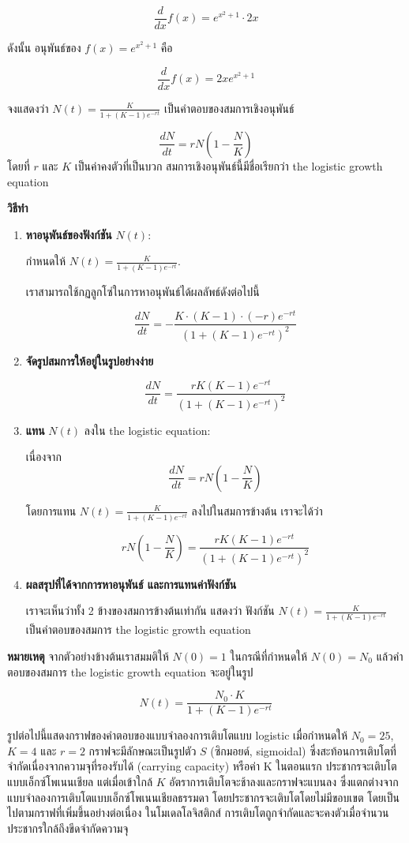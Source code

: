 \documentclass[
]{book}
\begin{document}
\[ \frac{d}{dx} f(x) = e^{x^2 + 1} \cdot 2x \]

ดังนั้น อนุพันธ์ของ \(f(x) = e^{x^2 + 1}\) คือ

\[ \boxed{\frac{d}{dx} f(x) = 2x e^{x^2 + 1}} \]

จงแสดงว่า \(N(t) = \frac{K}{1 + (K - 1) e^{-rt}}\)
เป็นคำตอบของสมการเชิงอนุพันธ์

\[ \frac{dN}{dt} = rN\left(1 - \frac{N}{K}\right) \]โดยที่ \(r\) และ \(K\)
เป็นค่าคงตัวที่เป็นบวก สมการเชิงอนุพันธ์นี้มีชื่อเรียกว่า the logistic growth equation

\textbf{วิธีทำ}

\begin{enumerate}
\def\labelenumi{\arabic{enumi}.}
\item
  \textbf{หาอนุพันธ์ของฟังก์ชัน} \(N(t)\):

  กำหนดให้ \(N(t) = \frac{K}{1 + (K - 1) e^{-rt}}\).

  เราสามารถใช้กฏลูกโซ่ในการหาอนุพันธ์ได้ผลลัพธ์ดังต่อไปนี้

  \[ \frac{dN}{dt} = -\frac{K \cdot (K - 1) \cdot (-r) e^{-rt}}{(1 + (K - 1) e^{-rt})^2} \]
\item
  \textbf{จัดรูปสมการให้อยู่ในรูปอย่างง่าย}

  \[ \frac{dN}{dt} = \frac{rK(K - 1) e^{-rt}}{(1 + (K - 1) e^{-rt})^2} \]
\item
  \textbf{แทน} \(N(t)\) ลงใน the logistic equation:

  เนื่องจาก\[ \frac{dN}{dt} = rN\left(1 - \frac{N}{K}\right) \]

  โดยการแทน \(N(t) = \frac{K}{1 + (K - 1) e^{-rt}}\) ลงไปในสมการข้างต้น
  เราจะได้ว่า

  \[ rN\left(1 - \frac{N}{K}\right) = \frac{rK(K - 1) e^{-rt}}{(1 + (K - 1) e^{-rt})^2} \]
\item
  \textbf{ผลสรุปที่ได้จากการหาอนุพันธ์ และการแทนค่าฟังก์ชัน}

  เราจะเห็นว่าทั้ง 2 ข้างของสมการข้างต้นเท่ากัน แสดงว่า ฟังก์ชัน
  \(N(t) = \frac{K}{1 + (K - 1) e^{-rt}}\) เป็นคำตอบของสมการ the logistic
  growth equation
\end{enumerate}

\textbf{หมายเหตุ} จากตัวอย่างข้างต้นเราสมมติให้ \(N(0) = 1\) ในกรณีที่กำหนดให้
\(N(0) = N_0\) แล้วคำตอบของสมการ the logistic growth equation จะอยู่ในรูป

\[N(t) = \frac{N_0 \cdot K}{1 + (K - 1) e^{-rt}}\]

รูปต่อไปนี้แสดงกราฟของคำตอบของแบบจำลองการเติบโตแบบ logistic เมื่อกำหนดให้
\(N_0 = 25\), \(K = 4\) และ \(r = 2\) กราฟจะมีลักษณะเป็นรูปตัว \(S\) (ซิกมอยด์,
sigmoidal) ซึ่งสะท้อนการเติบโตที่จำกัดเนื่องจากความจุที่รองรับได้ (carrying capacity)
หรือค่า K ในตอนแรก ประชากรจะเติบโตแบบเอ็กซ์โพเนนเชียล แต่เมื่อเข้าใกล้ \(K\)
อัตราการเติบโตจะช้าลงและกราฟจะแบนลง
ซึ่งแตกต่างจากแบบจำลองการเติบโตแบบเอ็กซ์โพเนนเชียลธรรมดา
โดยประชากรจะเติบโตโดยไม่มีขอบเขต โดยเป็นไปตามกราฟที่เพิ่มขึ้นอย่างต่อเนื่อง
ในโมเดลโลจิสติกส์ การเติบโตถูกจำกัดและจะคงตัวเมื่อจำนวนประชากรใกล้ถึงขีดจำกัดความจุ
\end{document}
